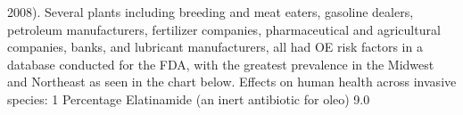 \documentclass{article}
\begin{document}
2008). Several plants including breeding and meat eaters, gasoline dealers, petroleum manufacturers, fertilizer companies, pharmaceutical and agricultural companies, banks, and lubricant manufacturers, all had OE risk factors in a database conducted for the FDA, with the greatest prevalence in the Midwest and Northeast as seen in the chart below. Effects on human health across invasive species: 1 Percentage Elatinamide (an inert antibiotic for oleo) 9.0%
\end{document}
